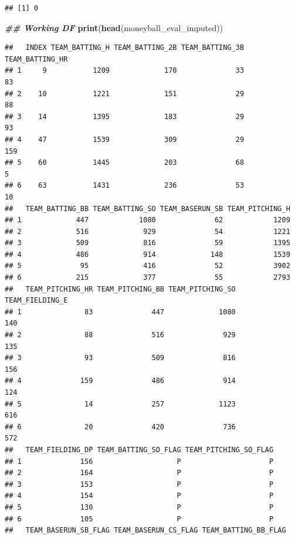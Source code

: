 \documentclass[
]{article}
\newenvironment{Shaded}{\begin{snugshade}}{\end{snugshade}}
\newcommand{\DocumentationTok}[1]{\textcolor[rgb]{0.56,0.35,0.01}{\textbf{\textit{#1}}}}
\newcommand{\FunctionTok}[1]{\textcolor[rgb]{0.13,0.29,0.53}{\textbf{#1}}}
\newcommand{\NormalTok}[1]{#1}
\begin{document}
\begin{verbatim}
## [1] 0
\end{verbatim}

\begin{Shaded}
\begin{Highlighting}[]
\DocumentationTok{\#\# Working DF }
\FunctionTok{print}\NormalTok{(}\FunctionTok{head}\NormalTok{(moneyball\_eval\_imputed))}
\end{Highlighting}
\end{Shaded}

\begin{verbatim}
##   INDEX TEAM_BATTING_H TEAM_BATTING_2B TEAM_BATTING_3B TEAM_BATTING_HR
## 1     9           1209             170              33              83
## 2    10           1221             151              29              88
## 3    14           1395             183              29              93
## 4    47           1539             309              29             159
## 5    60           1445             203              68               5
## 6    63           1431             236              53              10
##   TEAM_BATTING_BB TEAM_BATTING_SO TEAM_BASERUN_SB TEAM_PITCHING_H
## 1             447            1080              62            1209
## 2             516             929              54            1221
## 3             509             816              59            1395
## 4             486             914             148            1539
## 5              95             416              52            3902
## 6             215             377              55            2793
##   TEAM_PITCHING_HR TEAM_PITCHING_BB TEAM_PITCHING_SO TEAM_FIELDING_E
## 1               83              447             1080             140
## 2               88              516              929             135
## 3               93              509              816             156
## 4              159              486              914             124
## 5               14              257             1123             616
## 6               20              420              736             572
##   TEAM_FIELDING_DP TEAM_BATTING_SO_FLAG TEAM_PITCHING_SO_FLAG
## 1              156                    P                     P
## 2              164                    P                     P
## 3              153                    P                     P
## 4              154                    P                     P
## 5              130                    P                     P
## 6              105                    P                     P
##   TEAM_BASERUN_SB_FLAG TEAM_BASERUN_CS_FLAG TEAM_BATTING_BB_FLAG

\end{verbatim}
\end{document}
